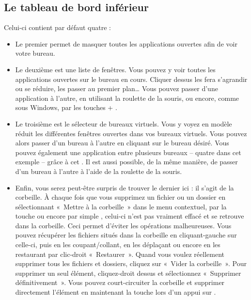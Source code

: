 \subsection{Le tableau de bord inférieur}
Celui-ci contient par défaut quatre  :
\begin{itemize}
\item Le premier permet de masquer toutes les applications ouvertes afin de voir votre bureau. 
\item Le deuxième est une liste de fenêtres. Vous pouvez y voir toutes les applications ouvertes sur le bureau en cours. Cliquer dessus les fera s'agrandir ou se réduire, les passer au premier plan\ldots{} Vous pouvez passer d'une application à l'autre, en utilisant la roulette de la souris, ou encore, comme sous Windows, par les touches  + .
\item Le troisième est le sélecteur de bureaux virtuels. Vous y voyez en modèle réduit les différentes fenêtres ouvertes dans vos bureaux virtuels. Vous pouvez alors passer d'un bureau à l'autre en cliquant sur le bureau désiré. Vous pouvez également  une application entre plusieurs bureaux -- quatre dans cet exemple -- grâce à cet . Il est aussi possible, de la même manière, de passer d'un bureau à l'autre à l'aide de la roulette de la souris.
\item Enfin, vous serez peut-être surpris de trouver le dernier  ici : il s'agit de la corbeille. À chaque fois que vous supprimez un fichier ou un dossier en sélectionnant «~Mettre à la corbeille~» dans le menu contextuel, par la touche  ou encore par simple , celui-ci n'est pas vraiment effacé et se retrouve dans la corbeille. Ceci permet d'éviter les opérations malheureuses. Vous pouvez récupérer les fichiers situés dans la corbeille en cliquant-gauche sur celle-ci, puis en les coupant/collant, en les déplaçant ou encore en les restaurant par clic-droit \FlecheDroite «~Restaurer~». Quand vous voulez réellement supprimer tous les fichiers et dossiers, cliquez sur «~Vider la corbeille~». Pour supprimer un seul élément, cliquez-droit dessus et sélectionnez «~Supprimer définitivement~». Vous pouvez court-circuiter la corbeille et supprimer directement l'élément en maintenant la touche  lors d'un appui sur .
\end{itemize}
